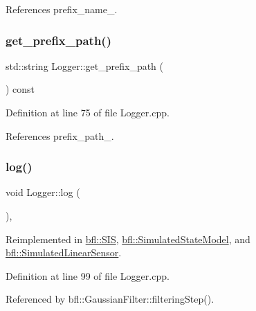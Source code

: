 References prefix\+\_\+name\+\_\+.

\mbox{\label{classbfl_1_1Logger_a56cf1a4e712bf23d9978420a8a59a62b}} 
\subsubsection{\texorpdfstring{get\+\_\+prefix\+\_\+path()}{get\_prefix\_path()}}
{\footnotesize\ttfamily std\+::string Logger\+::get\+\_\+prefix\+\_\+path (\begin{DoxyParamCaption}{ }\end{DoxyParamCaption}) const}



Definition at line 75 of file Logger.\+cpp.



References prefix\+\_\+path\+\_\+.

\mbox{\label{classbfl_1_1Logger_ad44f46593cb8c4c87c1178eb326e2f64}} 
\subsubsection{\texorpdfstring{log()}{log()}}
{\footnotesize\ttfamily void Logger\+::log (\begin{DoxyParamCaption}{ }\end{DoxyParamCaption})\hspace{0.3cm}{\ttfamily [protected]}, {\ttfamily [virtual]}}



Reimplemented in \mbox{\hyperlink{classbfl_1_1SIS_aeb0b87af1cc1fc4b616989ef489ecccc}{bfl\+::\+S\+IS}}, \mbox{\hyperlink{classbfl_1_1SimulatedStateModel_aa022eb0d50d898ffcc831af2907265b2}{bfl\+::\+Simulated\+State\+Model}}, and \mbox{\hyperlink{classbfl_1_1SimulatedLinearSensor_ab75bbe744d8516c97dfc90ad499b10e6}{bfl\+::\+Simulated\+Linear\+Sensor}}.



Definition at line 99 of file Logger.\+cpp.



Referenced by bfl\+::\+Gaussian\+Filter\+::filtering\+Step().

